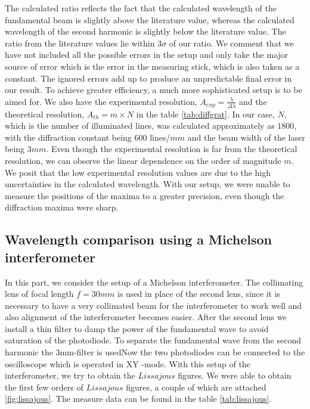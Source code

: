 The calculated ratio reflects the fact that the calculated wavelength of the fundamental beam is slightly above the literature value, whereas the calculated wavelength of the second harmonic is slightly below the literature value. The ratio from the literature values lie within $3\sigma$ of our ratio. We comment that we have not included all the possible errors in the setup and only take the major source of error which is the error in the measuring stick, which is also taken as a constant. The ignored errors add up to produce an unpredictable final error in our result. To achieve greater efficiency, a much more sophisticated setup is to be aimed for. We also have the experimental resolution, $A_{exp} = \frac{\lambda}{\Delta\lambda}$ and the theoretical resolution, $A_{th} = m \times N$ in the table \ref{tab:diffgrat}. In our case, $N$, which is the number of illuminated lines, was calculated approximately as $1800$, with the diffraction constant being $600$ lines/$mm$ and the beam width of the laser being $3mm$. Even though the experimental resolution is far from the theoretical resolution, we can observe the linear dependence on the order of magnitude $m$. We posit that the low experimental resolution values are due to the high uncertainties in the calculated wavelength. With our setup, we were unable to measure the positions of the maxima to a greater precision, even though the diffraction maxima were sharp.

\subsection{Wavelength comparison using a Michelson interferometer}
In this part, we consider the setup of a Michelson interferometer. The collimating lens of focal length $f=30mm$ is used in place of the second lens, since it is necessary to have a very collimated beam for the interferometer to work well and also alignment of the interferometer becomes easier. After the second lens we install a thin filter to damp the power of the fundamental wave to avoid saturation of the photodiode. To separate the fundamental wave from the second harmonic the 3mm-filter is usedNow the two photodiodes can be connected to the oscilloscope which is operated in XY -mode. With this setup of the interferometer, we try to obtain the $Lissajous$ figures. We were able to obtain the first few orders of $Lissajous$ figures, a couple of which are attached \ref{fig:lissajous}. The measure data can be found in the table \ref{tab:lissajous}.\\

